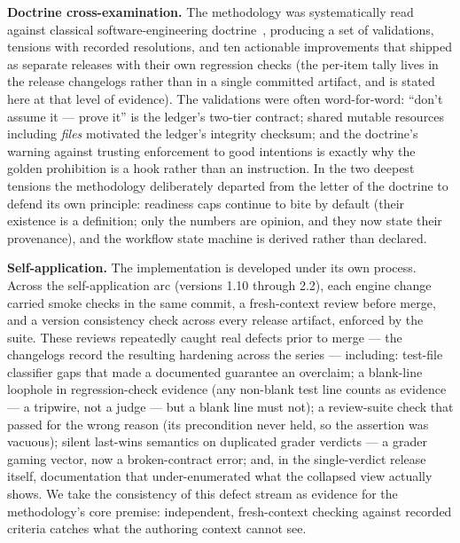 \documentclass[11pt]{article}
\begin{document}
\textbf{Doctrine cross-examination.} The methodology was systematically read
against classical software-engineering doctrine~\cite{thomas2019pragmatic},
producing a set of validations, tensions with recorded resolutions, and ten actionable improvements that shipped as separate releases with their own regression checks (the per-item tally lives in the release changelogs rather than in a single committed artifact, and is stated here at that level of evidence). The validations were often word-for-word:
``don't assume it --- prove it'' is the ledger's two-tier contract; shared
mutable resources including \emph{files} motivated the ledger's integrity
checksum; and the doctrine's warning against trusting enforcement to good
intentions is exactly why the golden prohibition is a hook rather than an
instruction. In the two deepest tensions the methodology
deliberately departed from the letter of the doctrine to defend its own
principle: readiness caps continue to bite by default (their existence is a
definition; only the numbers are opinion, and they now state their
provenance), and the workflow state machine is derived rather than declared.

\textbf{Self-application.} The implementation is developed under its own
process. Across the self-application arc (versions 1.10 through 2.2), each engine
change carried smoke checks in the same commit, a fresh-context review before
merge, and a version consistency check across every release artifact, enforced
by the suite. These reviews repeatedly caught real defects prior to
merge --- the changelogs record the resulting hardening across the series ---
including: test-file
classifier gaps that made a documented guarantee an overclaim; a blank-line
loophole in regression-check evidence (any non-blank test line counts as
evidence --- a tripwire, not a judge --- but a blank line must not); a
review-suite check that passed for the wrong reason (its precondition never
held, so the assertion was vacuous); silent last-wins semantics on
duplicated grader verdicts --- a grader gaming vector, now a broken-contract
error; and, in the single-verdict release itself, documentation that
under-enumerated what the collapsed view actually shows. We take the
consistency of this defect stream as evidence for the methodology's core
premise: independent, fresh-context checking against recorded criteria
catches what the authoring context cannot see.
\end{document}
